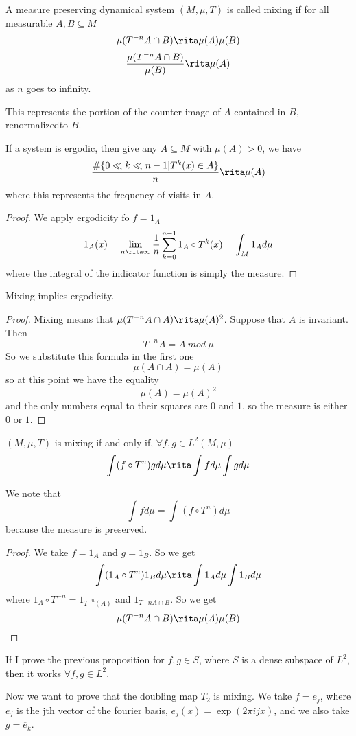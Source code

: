 \begin{definition}
	A measure preserving dynamical system $(M,\mu,T)$ is called mixing if for all measurable $A,B \subseteq M$
	$$
		\mu(T^{-n}A\cap B) \rita \mu(A)\mu(B)
	$$
	$$
		\frac{\mu(T^{-n}A\cap B)}{\mu(B)} \rita \mu(A)
	$$
	as $n$ goes to infinity.
\end{definition}
This represents the portion of the counter-image of $A$ contained in $B$, renormalizedto $B$.
\begin{prop}
	If a system is ergodic, then give any $A\subseteq M$ with $\mu(A) > 0$, we have
	$$
		\frac{\# \{0 \ll k \ll n-1 | T^k(x)\in A\}}{n} \rita \mu(A)
	$$
	where this represents the frequency of visits in $A$.
\end{prop}
\begin{proof}
	We apply ergodicity fo $f = 1_A$	
	$$
		1_A(x) = \lim_{n\rita\infty} \frac{1}{n}\sum_{k=0}^{n-1}1_A \circ T^k(x) = \int_M 1_A d\mu
	$$
	where the integral of the indicator function is simply the measure.
\end{proof}
\begin{prop}
	Mixing implies ergodicity.
\end{prop}
\begin{proof}
	Mixing means that $\mu(T^{-n}A \cap A) \rita \mu(A)^2$. Suppose that $A$ is invariant. Then
	$$
		T^{-n}A = A \ mod \ \mu
	$$
	So we substitute this formula in the first one
	$$
		\mu(A \cap A) = \mu(A)
	$$
	so at this point we have the equality 
	$$
		\mu(A) = \mu(A)^2
	$$
	and the only numbers equal to their squares are $0$ and $1$, so the measure is either $0$ or $1$.
\end{proof}
\begin{prop}
	$(M,\mu,T)$ is mixing if and only if, $\forall f,g \in L^2(M,\mu)$
	$$
		\int (f\circ T^n)g d\mu \rita \int f d\mu \int g d\mu 
	$$
\end{prop}
We note that
$$
	\int f d\mu = \int (f\circ T^n) d\mu
$$
because the measure is preserved.
\begin{proof}
	We take $f = 1_A$ and $g = 1_B$. So we get
	$$
		\int (1_A \circ T^n)1_B d\mu \rita \int 1_A d\mu \int 1_B d\mu
	$$
	where $1_A \circ T^{-n} = 1_{T^{-n}(A)}$ and $1_{T{-n}A\cap B}$.
	So we get
	$$
		\mu(T^{-n}A\cap B) \rita \mu(A)\mu(B)
	$$
\end{proof}
\begin{prop}
	If I prove the previous proposition for $f,g\in S$, where $S$ is a dense subspace of $L^2$, then it works $\forall f,g \in L^2$.	
\end{prop}
Now we want to prove that the doubling map $T_2$ is mixing. We take $f = e_j$, where $e_j$ is the jth vector of the fourier basis, $e_j(x) = \exp(2\pi ij x)$, and we also take $g = \overline{e}_k$.
